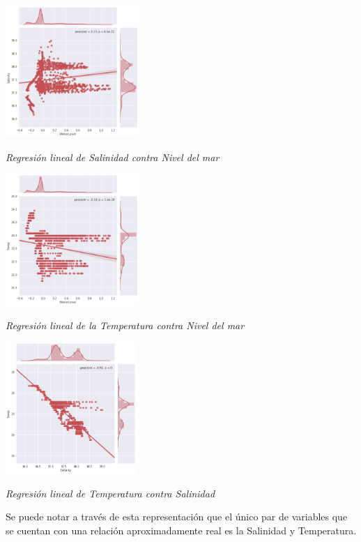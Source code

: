 \documentclass[a4paper]{article}
\begin{document}
\begin{center}
	\includegraphics[height=5cm]{Regresion1.png}
    
    \textit{Regresión lineal de Salinidad contra Nivel del mar}
\end{center}

\begin{center}
	\includegraphics[height=5cm]{Regresion2.png}
    
    \textit{Regresión lineal de la Temperatura contra Nivel del mar}
\end{center}

\begin{center}
	\includegraphics[height=5cm]{Regresion3.png}
    
    \textit{Regresión lineal de Temperatura contra Salinidad}
\end{center}

Se puede notar a través de esta representación que el único par de variables que se cuentan con una relación aproximadamente real es la Salinidad y Temperatura.
\end{document}

